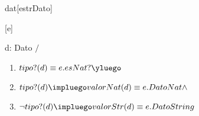 \begin{Representacion}

  \begin{Estructura}{dat}[estrDato]

    \begin{Tupla}[estrDato]
    \end{Tupla}

  \end{Estructura}
  

    

  [e]{d: Dato $/$ \\
     \begin{enumerate}
		\item $tipo?(d) \equiv e.esNat? \yluego$
        \item $tipo?(d) \impluego valorNat(d) \equiv e.DatoNat \land$ 
      	\item $\neg tipo?(d) \impluego valorStr(d) \equiv e.DatoString $ 
      \end{enumerate} 
  }
    
\end{Representacion}



